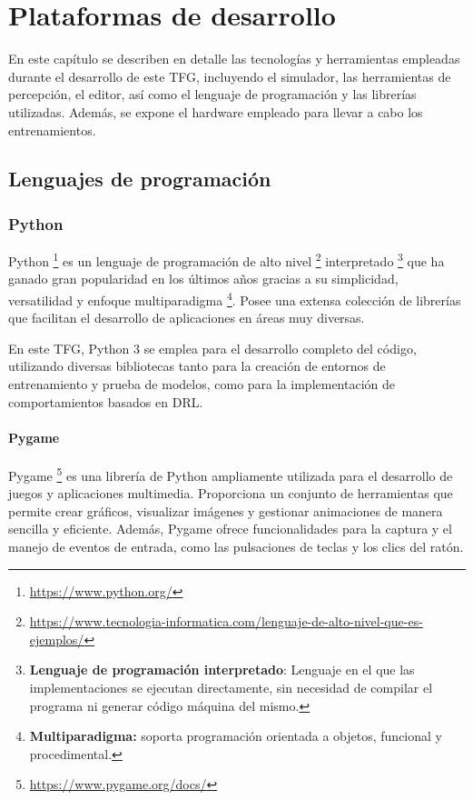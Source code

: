 \chapter{Plataformas de desarrollo}
\label{cap:capitulo3}

En este capítulo se describen en detalle las tecnologías y herramientas empleadas durante el desarrollo de este \ac{TFG}, incluyendo el simulador, las herramientas de percepción, el editor, así como el lenguaje de programación y las librerías utilizadas. Además, se expone el hardware empleado para llevar a cabo los entrenamientos.

\section{Lenguajes de programación}
\label{sec:programación}
\subsection{Python}
\label{sec:python}

Python \footnote{\url{https://www.python.org/}} es un lenguaje de programación de alto nivel \footnote{\url{https://www.tecnologia-informatica.com/lenguaje-de-alto-nivel-que-es-ejemplos/}} interpretado \footnote{\textbf{Lenguaje de programación interpretado}: Lenguaje en el que las implementaciones se ejecutan directamente, sin necesidad de compilar el programa ni generar código máquina del mismo.} que ha ganado gran popularidad en los últimos años gracias a su simplicidad, versatilidad y enfoque multiparadigma \footnote{\textbf{Multiparadigma:} soporta programación orientada a objetos, funcional y procedimental.}. Posee una extensa colección de librerías que facilitan el desarrollo de aplicaciones en áreas muy diversas.

En este \ac{TFG}, Python 3 se emplea para el desarrollo completo del código, utilizando diversas bibliotecas tanto para la creación de entornos de entrenamiento y prueba de modelos, como para la implementación de comportamientos basados en \ac{DRL}.

\subsubsection{Pygame}
\label{sec:pygame}

Pygame \footnote{\url{https://www.pygame.org/docs/}} es una librería de Python ampliamente utilizada para el desarrollo de juegos y aplicaciones multimedia. Proporciona un conjunto de herramientas que permite crear gráficos, visualizar imágenes y gestionar animaciones de manera sencilla y eficiente. Además, Pygame ofrece funcionalidades para la captura y el manejo de eventos de entrada, como las pulsaciones de teclas y los clics del ratón.

